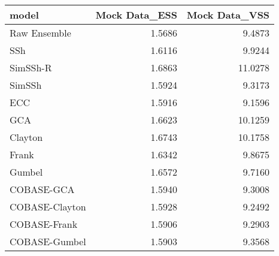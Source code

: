 \begin{table}[ht]
\centering
\begin{tabular}{lrr}
  \hline
model & Mock Data\_ESS & Mock Data\_VSS \\ 
  \hline
Raw Ensemble & 1.5686 & 9.4873 \\ 
  SSh & 1.6116 & 9.9244 \\ 
  SimSSh-R & 1.6863 & 11.0278 \\ 
  SimSSh & 1.5924 & 9.3173 \\ 
  ECC & 1.5916 & 9.1596 \\ 
  GCA & 1.6623 & 10.1259 \\ 
  Clayton & 1.6743 & 10.1758 \\ 
  Frank & 1.6342 & 9.8675 \\ 
  Gumbel & 1.6572 & 9.7160 \\ 
  COBASE-GCA & 1.5940 & 9.3008 \\ 
  COBASE-Clayton & 1.5928 & 9.2492 \\ 
  COBASE-Frank & 1.5906 & 9.2903 \\ 
  COBASE-Gumbel & 1.5903 & 9.3568 \\ 
   \hline
\end{tabular}
\end{table}
